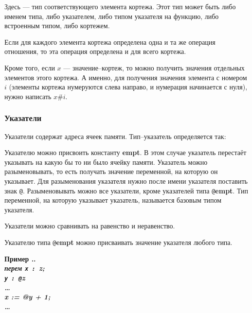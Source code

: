 \documentclass[10pt]{report}
\newcounter{exam}[section]
\renewcommand{\theexam}{\thesection.\arabic{exam}}
\newenvironment{Example}{\par\refstepcounter{exam}\bf Пример \theexam. \sl}{\rm\par}
\begin{document}
Здесь \textcolor{Green}{}  --- тип соответствующего элемента кортежа. Этот тип может быть либо именем типа, либо указателем, либо типом указателя на функцию, либо встроенным типом, либо кортежем.

Если для каждого элемента кортежа определена одна и та же операция отношения, то эта операция определена и для всего кортежа.

Кроме того, если $x$ --- значение--кортеж, то можно получить значения отдельных элементов этого кортежа. А именно, для получения значения элемента с номером $i$ (элементы кортежа нумеруются слева направо, и нумерация начинается с нуля), нужно написать $x\texttt{\#}i$.

        \subsubsection{Указатели}
Указатели содержат адреса ячеек памяти. Тип--указатель определяется так:
\begin{center}
\noindent\textcolor{Green}{}
\end{center}

Указателю можно присвоить константу \textbf{empt}. В этом случае указатель перестаёт указывать на какую бы то ни было ячейку памяти. Указатель можно разыменовывать, то есть
получать значение переменной, на которую он указывает. Для разыменования указателя нужно после имени указателя поставить знак \texttt{@}. Разыменовывать можно все указатели,
кроме указателей типа \texttt{@}\textbf{empt}. Тип переменной, на которую указывает указатель, называется базовым типом указателя.

Указатели можно сравнивать на равенство и неравенство. 

Указателю типа \texttt{@}\textbf{empt} можно присваивать значение указателя любого типа.

\begin{Example}\\
\rm
\textbf{перем} \texttt{x : }\textbf{z};\\
\hspace*{12mm}\texttt{y : @}\textbf{z}\\
\hspace*{12mm}\dots\\
\hspace*{12mm}x := @y + 1;\\
\hspace*{12mm}\dots
\end{Example}
\end{document}
